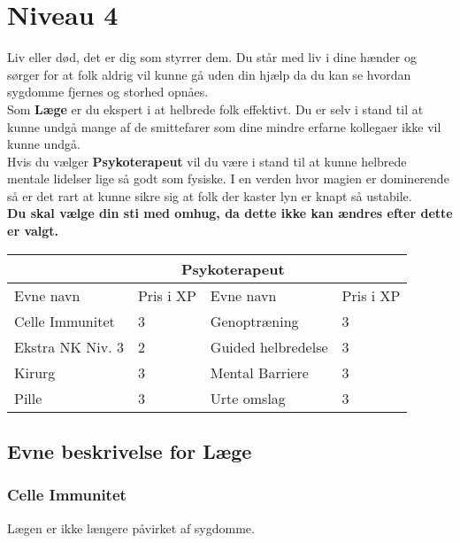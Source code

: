 \chapter*{Niveau 4}
Liv eller død, det er dig som styrrer dem. Du står med liv i dine hænder og sørger for at folk aldrig vil kunne gå uden din hjælp da du kan se hvordan sygdomme fjernes og storhed opnåes.\\
Som \textbf{Læge} er du ekspert i at helbrede folk effektivt. Du er selv i stand til at kunne undgå mange af de smittefarer som dine mindre erfarne kollegaer ikke vil kunne undgå.\\ 
Hvis du vælger \textbf{Psykoterapeut} vil du være i stand til at kunne helbrede mentale lidelser lige så godt som fysiske. I en verden hvor magien er dominerende så er det rart at kunne sikre sig at folk der kaster lyn er knapt så ustabile.\\

\textbf{Du skal vælge din sti med omhug, da dette ikke kan ændres efter dette er valgt.}\\

\begin{tabular}{|p{}|p{}|p{}|p{}|}
\hline
\rowcolor{cerulean!80}
 \multicolumn{2}{|c|}{ Læge } & \multicolumn{2}{|c|}{ Psykoterapeut }\\
\hline
\rowcolor{cerulean!40}
    Evne navn & Pris i XP & Evne navn & Pris i XP\\ \hline
    Celle Immunitet & 3 & Genoptræning & 3 \\\hline
    Ekstra NK Niv. 3 & 2 &Guided helbredelse& 3 \\\hline
    Kirurg & 3 & Mental Barriere & 3\\\hline
    Pille & 3 & Urte omslag & 3\\\hline 
\end{tabular}

\section*{Evne beskrivelse for Læge}

\subsection*{Celle Immunitet}
Lægen er ikke længere påvirket af sygdomme.

